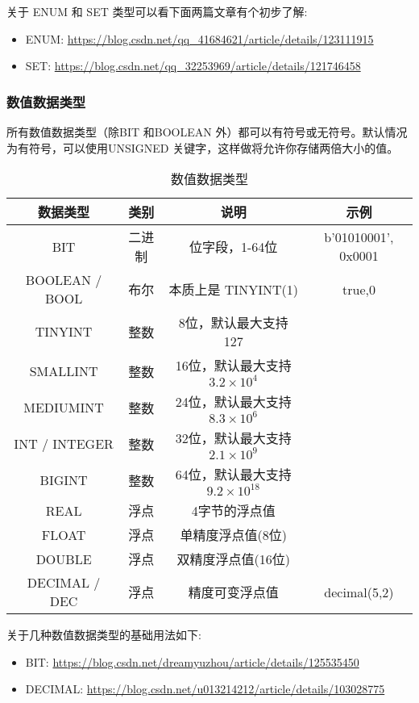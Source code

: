 关于 ENUM 和 SET 类型可以看下面两篇文章有个初步了解:
\begin{itemize}
    \item ENUM: \url{https://blog.csdn.net/qq_41684621/article/details/123111915}
    \item SET: \url{https://blog.csdn.net/qq_32253969/article/details/121746458}
\end{itemize}

\subsubsection{数值数据类型}

所有数值数据类型（除BIT 和BOOLEAN 外）都可以有符号或无符号。默认情况为有符号，可以使用UNSIGNED 关键字，这样做将允许你存储两倍大小的值。

\begin{table}[H]
    \small
    \centering
    \caption{数值数据类型}
    \label{table:数值数据类型}
    \setlength{\tabcolsep}{4mm}
    \begin{tabular}{c|ccc}
        \toprule
        \textbf{数据类型} & \textbf{类别} & \textbf{说明} & \textbf{示例} \\
        \midrule
        BIT & 二进制 & 位字段，1-64位 & b'01010001', 0x0001 \\
        \midrule
        BOOLEAN / BOOL & 布尔 & 本质上是 TINYINT(1) & true,0 \\
        \midrule
        TINYINT & 整数 & 8位，默认最大支持 127&  \\
        SMALLINT & 整数 & 16位，默认最大支持 $ 3.2 \times 10^4$  &  \\
        MEDIUMINT & 整数 & 24位，默认最大支持 $ 8.3 \times 10^6$ &  \\
        INT / INTEGER & 整数 & 32位，默认最大支持 $ 2.1 \times 10^9$ &  \\
        BIGINT & 整数 & 64位，默认最大支持 $ 9.2 \times 10^18$ &  \\
        \midrule
        REAL & 浮点 & 4字节的浮点值 &  \\
        FLOAT & 浮点 & 单精度浮点值(8位) &  \\
        DOUBLE & 浮点 & 双精度浮点值(16位) &  \\
        DECIMAL / DEC & 浮点 & 精度可变浮点值 & decimal(5,2) \\
        \bottomrule
    \end{tabular}
\end{table}

关于几种数值数据类型的基础用法如下:
\begin{itemize}
    \item BIT: \url{https://blog.csdn.net/dreamyuzhou/article/details/125535450}
    \item DECIMAL: \url{https://blog.csdn.net/u013214212/article/details/103028775}
\end{itemize}

